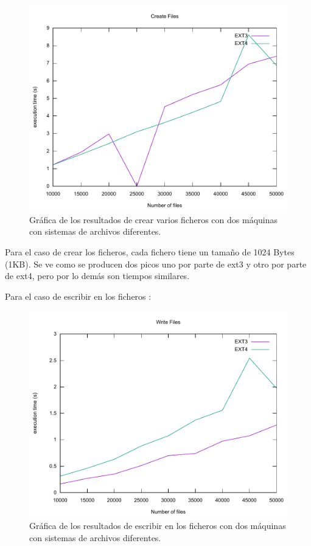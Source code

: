 \begin{figure}[H]
	\begin{center}
		\includegraphics[width=15cm]{Imagenes/Create_Files}
		\caption{Gráfica de los resultados de crear varios ficheros con dos máquinas con sistemas de archivos diferentes.}
		\label{fig:29}
	\end{center}
\end{figure}

Para el caso de crear los ficheros, cada fichero tiene un tamaño de 1024 Bytes (1KB). Se ve como se producen dos picos uno por parte de ext3 y otro por parte de ext4, pero por lo demás son tiempos similares.

\newpage
Para el caso de escribir en los ficheros :

\begin{figure}[H]
	\begin{center}
		\includegraphics[width=15cm]{Imagenes/Write_Files}
		\caption{Gráfica de los resultados de escribir en los ficheros con dos máquinas con sistemas de archivos diferentes.}
		\label{fig:30}
	\end{center}
\end{figure}

